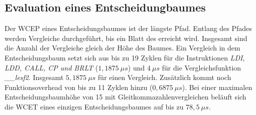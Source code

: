 \subsection{Evaluation eines Entscheidungbaumes}
Der WCEP eines Entscheidungsbaumes ist der längste Pfad. Entlang des Pfades werden Vergleiche durchgeführt, bis ein Blatt des erreicht wird. Insgesamt sind die Anzahl der Vergleiche gleich der Höhe des Baumes.
\newline
\newline
Ein Vergleich in dem Entscheidungsbaum setzt sich aus bis zu 19 Zyklen für die Instruktionen \textit{LDI, LDD, CALL, CP und BRLT} ($1,1875\ \mu s$) und $4\ \mu s$ für die Vergleichsfunktion \textit{\_\_lesf2}.
Insgesamt $5,1875\ \mu s$ für einen Vergleich.
\newline
\newline
Zusätzlich kommt noch Funktionsoverhead von bis zu 11 Zyklen hinzu ($0,6875\ \mu s$). Bei einer maximalen Entscheidungsbaumhöhe von 15 mit Gleitkommazahlenvergleichen
beläuft sich die WCET eines einzigen Entscheidungsbaumes auf bis zu $78,5\ \mu s$.